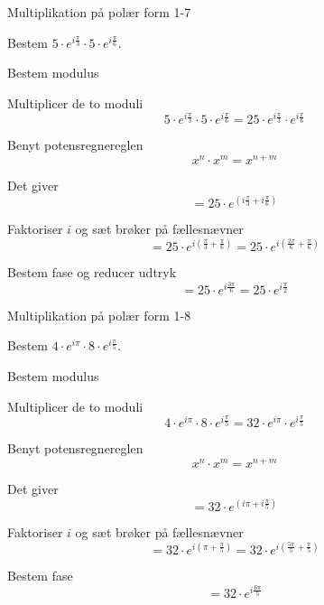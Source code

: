 \documentclass{article}
\begin{document}
\newpage

\begin{exercise}{Multiplikation på polær form 1-7}
	
	Bestem $5 \cdot e^{i \frac{\pi}{3}} \cdot 5 \cdot e^{i \frac{\pi}{6}}$.
	
	
	
	\hint 
	
	Bestem modulus
	
	
	\hint
	
	Multiplicer de to moduli 
	\[
	5 \cdot e^{i \frac{\pi}{3}} \cdot 5 \cdot e^{i \frac{\pi}{6}} = 25 \cdot e^{i \frac{\pi}{3}} \cdot e^{i \frac{\pi}{6}}
	\]
	
	\hint 
	
	Benyt potensregnereglen
	\[
	x^n \cdot x^m = x^{n+m}
	\]
	
	\hint
	
	Det giver
	\[
	=25 \cdot e^{(i \frac{\pi}{3} + i \frac{\pi}{6})}
	\]
	
	\hint
	
	Faktoriser $i$ og sæt brøker på fællesnævner
	\[
	=25 \cdot e^{i( \frac{\pi}{3} + \frac{\pi}{6})} = 25 \cdot e^{i( \frac{2\pi}{6}+ \frac{\pi}{6})}
	\]
	
	\hint
	
	Bestem fase og reducer udtryk
	\[
	= 25 \cdot e^{i \frac{3\pi}{6} } = 25 \cdot e^{i \frac{\pi}{2} }
	\]
	
	
\end{exercise}


\newpage

\begin{exercise}{Multiplikation på polær form 1-8}
	
	Bestem $4 \cdot e^{i \pi} \cdot 8 \cdot e^{i \frac{\pi}{5}}$.
	
	
	
	\hint 
	
	Bestem modulus
	
	
	\hint
	
	Multiplicer de to moduli 
	\[
	4 \cdot e^{i \pi} \cdot 8 \cdot e^{i \frac{\pi}{5}} = 32 \cdot e^{i \pi} \cdot e^{i \frac{\pi}{5}}
	\]
	
	\hint 
	
	Benyt potensregnereglen
	\[
	x^n \cdot x^m = x^{n+m}
	\]
	
	\hint
	
	Det giver
	\[
	=32 \cdot e^{(i \pi + i \frac{\pi}{5})}
	\]
	
	\hint
	
	Faktoriser $i$ og sæt brøker på fællesnævner
	\[
	= 32 \cdot e^{i( \pi+ \frac{\pi}{5})} = 32 \cdot e^{i( \frac{5\pi}{5} + \frac{\pi}{5})} 
	\]
	
	\hint
	
	Bestem fase
	\[
	= 32 \cdot e^{i \frac{6 \pi}{5}}
	\]
	
	
\end{exercise}
\end{document}
